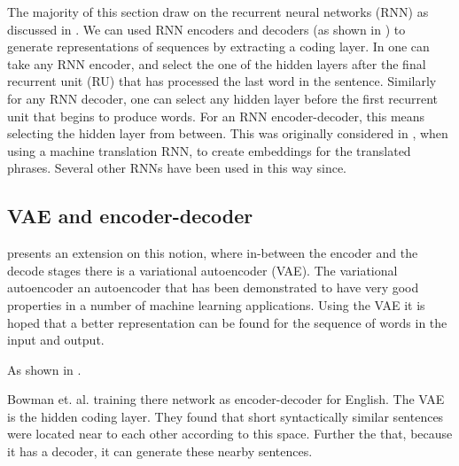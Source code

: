\documentclass[12pt,parskip]{komatufte}
\begin{document}
The majority of this section draw on the recurrent neural networks (RNN) as discussed in .
We can used RNN encoders and decoders (as shown in ) to generate representations of sequences by extracting a coding layer.
In one can take any RNN encoder,
and select the one of the hidden layers after the final recurrent unit (RU) that has processed the last word in the sentence.
Similarly for any RNN decoder, one can select any hidden layer before the first recurrent unit that begins to produce words.
For an RNN encoder-decoder, this means selecting the hidden layer from between.
This was originally considered in , when using a machine translation RNN, to create embeddings for the translated phrases.
Several other RNNs have been used in this way since.

\subsection{VAE and encoder-decoder}
 presents an extension on this notion,
where in-between the encoder and the decode stages there is a variational autoencoder (VAE).
The variational autoencoder  an autoencoder that has been demonstrated to have very good properties in a number of machine learning applications.
Using the VAE it is hoped that a better representation can be found for the sequence of words in the input and output.

As shown in .

Bowman et. al. training there network as encoder-decoder for English.
The VAE is the hidden coding layer. 
They found that short syntactically similar sentences were located near to each other according to this space.
Further the that, because it has a decoder, it can generate these nearby sentences.
\end{document}
